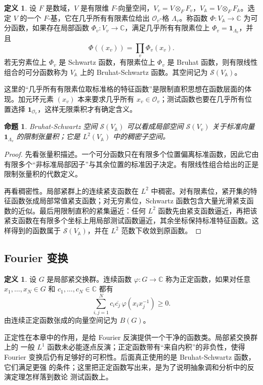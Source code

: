\documentclass[11pt,a4paper,openany]{ctexbook}
\numberwithin{equation}{chapter}
\newcommand{\C}{\mathbb{C}}
\newcommand{\A}{\mathbb{A}}
\theoremstyle{plain}
\newtheorem{proposition}[theorem]{命题}
\theoremstyle{definition}
\newtheorem{definition}[theorem]{定义}
\theoremstyle{remark}
\begin{document}
\begin{definition}
设 $F$ 是数域，$V$ 是有限维 $F$-向量空间，$V_v=V\otimes_FF_v$，$V_{\A}=V\otimes_FF_{\A}$。选定 $V$ 的一个 $F$-基，它在几乎所有有限素位给出 $\mathcal O_v$-格 $\Lambda_v$。称函数 $\Phi:V_{\A}\to\C$ 为可分函数，如果存在局部函数 $\Phi_v:V_v\to\C$，满足几乎所有有限素位上 $\Phi_v=\mathbf 1_{\Lambda_v}$，并且
\[
  \Phi((x_v))=\prod_v\Phi_v(x_v).
\]
若无穷素位上 $\Phi_v$ 是 Schwartz 函数，有限素位上 $\Phi_v$ 是 Bruhat 函数，则有限线性组合的可分函数称为 $V_{\A}$ 上的 Bruhat-Schwartz 函数。其空间记为 $\mathcal S(V_{\A})$。
\end{definition}

这里的“几乎所有有限素位取标准格的特征函数”是限制直积思想在函数层面的体现。加元环元素 $(x_v)$ 本来要求几乎所有 $x_v\in\mathcal O_v$；测试函数也要在几乎所有位置选择 $\mathbf 1_{\mathcal O_v}$，这样无限乘积才有确定含义。

\begin{proposition}
Bruhat-Schwartz 空间 $\mathcal S(V_{\A})$ 可以看成局部空间 $\mathcal S(V_v)$ 关于标准向量 $\mathbf 1_{\Lambda_v}$ 的限制张量积；它是 $L^2(V_{\A})$ 中的稠密子空间。
\end{proposition}

\begin{proof}
先看张量积描述。一个可分函数只在有限多个位置偏离标准函数，因此它由有限多个“非标准局部因子”与其余位置的标准因子决定。有限线性组合给出的正是限制张量积的代数定义。

再看稠密性。局部紧群上的连续紧支函数在 $L^2$ 中稠密。对有限素位，紧开集的特征函数张成局部常值紧支函数；对无穷素位，Schwartz 函数包含大量光滑紧支函数的近似。最后用限制直积的紧集逼近：任何 $L^2$ 函数先由紧支函数逼近，再把该紧支函数在有限多个坐标上用局部测试函数逼近，其余坐标保持标准特征函数。这样得到的函数属于 $\mathcal S(V_{\A})$，并在 $L^2$ 范数下收敛到原函数。
\end{proof}

\subsection{Fourier 变换}

\begin{definition}
设 $G$ 是局部紧交换群。连续函数 $\varphi:G\to\C$ 称为正定函数，如果对任意
$x_1,\ldots,x_N\in G$ 和 $c_1,\ldots,c_N\in\C$ 都有
\[
  \sum_{i,j=1}^N c_i\overline{c_j}\,
  \varphi(x_i x_j^{-1})\ge 0.
\]
由连续正定函数张成的向量空间记为 $B(G)$。
\end{definition}

正定性在本章中的作用，是给 Fourier 反演提供一个干净的函数类。局部紧交换群上的
一般 $L^1$ 函数未必能逐点反演；正定函数带有“来自内积”的非负性，使得 Fourier
变换后仍有足够好的可积性。后面真正使用的是 Bruhat-Schwartz 函数，它们满足更强
的条件；这里把正定函数写出来，是为了说明抽象调和分析中的反演定理怎样落到数论
测试函数上。
\end{document}
